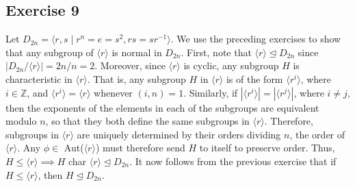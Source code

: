 \subsection*{Exercise 9}
Let $D_{2n} = \langle r,s \mid r^n = e = s^2, rs = sr^{-1} \rangle$. We use the preceding exercises to show that any subgroup of $\langle r \rangle$ is normal in $D_{2n}$. First, note that $\langle r \rangle \trianglelefteq D_{2n}$ since $|D_{2n}/\langle r \rangle| = 2n/n = 2$. Moreover, since $\langle r \rangle$ is cyclic, any subgroup $H$ is characteristic in $\langle r \rangle$. That is, any subgroup $H$ in $\langle r \rangle$ is of the form $\langle r^i \rangle$, where $i \in \mathbb{Z}$, and $\langle r^i \rangle = \langle r \rangle$ whenever $(i,n) = 1$. Similarly, if $|\langle r^i \rangle| = |\langle r^j \rangle|$, where $i \not= j$, then the exponents of the elements in each of the subgroups are equivalent modulo $n$, so that they both define the same subgroups in $\langle r \rangle$. Therefore, subgroups in $\langle r \rangle$ are uniquely determined by their orders dividing $n$, the order of $\langle r \rangle$. Any $\phi \in$ Aut($\langle r \rangle$) must therefore send $H$ to itself to preserve order. Thus, $H \le \langle r \rangle \implies H$ char $\langle r \rangle \trianglelefteq D_{2n}$. It now follows from the previous exercise that if $H \le \langle r \rangle$, then $H \trianglelefteq D_{2n}$.
